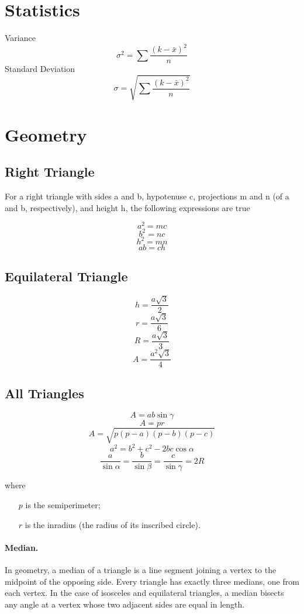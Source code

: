 \documentclass{book}
\newcommand*\mean[1]{\bar{#1}}
\begin{document}
\section{Statistics}
Variance
\[\sigma^2 = \sum \frac{\left ( k-\mean{x} \right ) ^ 2}{n}\]
Standard Deviation
\[\sigma = \sqrt{\sum \frac{\left ( k-\mean{x} \right ) ^ 2}{n}}\]

\section{Geometry}

\subsection{Right Triangle}
For a right triangle with sides a and b, hypotenuse c, projections m and n (of a and b, respectively), and height h,
the following expressions are true

\[a^2 = m c\]
\[b^2 = n c\]
\[h^2 = m n\]
\[a b = c h\]

\subsection{Equilateral Triangle}
\[h = \frac{a \sqrt{3}}{2}\]
\[r = \frac{a \sqrt{3}}{6}\]
\[R = \frac{a \sqrt{3}}{3}\]
\[A = \frac{a^2 \sqrt{3}}{4}\]

\subsection{All Triangles}
\[A = a b \sin \gamma \]
\[A = p r\]
\[A = \sqrt{p \left ( p - a \right ) \left ( p - b \right ) \left ( p - c \right )}\]
\[a^2 = b^2 + c^2 - 2 b c \cos \alpha\]
\[\frac{a}{\sin \alpha} = \frac{b}{\sin \beta} = \frac{c}{\sin \gamma} = 2R\]

where

\begin{itemize}
  \item[\(p\)] is the semiperimeter;
  \item[\(r\)] is the inradius (the radius of its inscribed circle).
\end{itemize}

\paragraph{Median.} In geometry, a median of a triangle is a line segment
joining a vertex to the midpoint of the opposing side. Every triangle has
exactly three medians, one from each vertex. In the case of isosceles and
equilateral triangles, a median bisects any angle at a vertex whose two adjacent
sides are equal in length.
\end{document}
